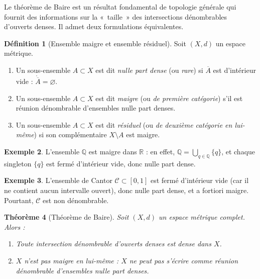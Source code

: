 \documentclass[a4paper,12pt]{book}
\newcommand{\Q}{\mathbb{Q}}
\newcommand{\R}{\mathbb{R}}
\theoremstyle{definition}
\newtheorem{definition}{Définition}[chapter]
\newtheorem{exemple}[definition]{Exemple}
\theoremstyle{plain}
\newtheorem{theoreme}[definition]{Théorème}
\theoremstyle{remark}
\begin{document}

Le théorème de Baire est un résultat fondamental de topologie générale qui fournit
des informations sur la «~taille~» des intersections dénombrables d'ouverts denses.
Il admet deux formulations équivalentes.

\begin{definition}[Ensemble maigre et ensemble résiduel]
\label{def:maigre-residuel}
Soit $(X,d)$ un espace métrique.
\begin{enumerate}[label=(\roman*)]
  \item Un sous-ensemble $A \subset X$ est dit \emph{nulle part dense}
    (ou \emph{rare}) si $\overline{A}$ est d'intérieur vide :
    $\mathring{\overline{A}} = \varnothing$.
  \item Un sous-ensemble $A \subset X$ est dit \emph{maigre}
    (ou \emph{de première catégorie}) s'il est réunion
    dénombrable d'ensembles nulle part denses.
  \item Un sous-ensemble $A \subset X$ est dit \emph{résiduel}
    (ou \emph{de deuxième catégorie en lui-même}) si son
    complémentaire $X \setminus A$ est maigre.
\end{enumerate}
\end{definition}

\begin{exemple}
\label{ex:Q-maigre}
L'ensemble $\Q$ est maigre dans $\R$ : en effet, $\Q = \bigcup_{q \in \Q} \{q\}$,
et chaque singleton $\{q\}$ est fermé d'intérieur vide, donc nulle part dense.
\end{exemple}

\begin{exemple}
\label{ex:cantor-maigre}
L'ensemble de Cantor $\mathcal{C} \subset [0,1]$ est fermé
d'intérieur vide (car il ne contient aucun intervalle ouvert), donc nulle part dense,
et a fortiori maigre. Pourtant, $\mathcal{C}$ est non dénombrable.
\end{exemple}

\begin{theoreme}[Théorème de Baire]
\label{thm:baire}
Soit $(X,d)$ un espace métrique complet. Alors :
\begin{enumerate}[label=(\roman*)]
  \item Toute intersection dénombrable d'ouverts denses est dense dans $X$.
  \item $X$ n'est pas maigre en lui-même : $X$ ne peut pas s'écrire comme réunion
    dénombrable d'ensembles nulle part denses.
\end{enumerate}
\end{theoreme}
\end{document}
